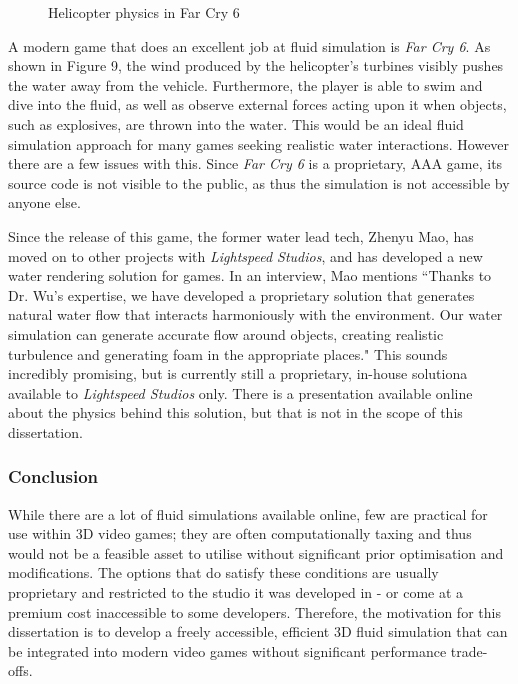 \documentclass[12pt]{article}
\newcommand{\wideimage}[2][]{%
  \makebox[\textwidth][c]{\texttt{[image: \#2]}}%
}
\begin{document}
    \begin{figure}[H]
        \wideimage[]{farCry6.png}
        \caption{Helicopter physics in Far Cry 6 \cite{farcry6video}}
    \end{figure}

    A modern game that does an excellent job at fluid simulation is \textit{Far Cry 6}. As shown in Figure 9, the wind produced by the helicopter's turbines visibly pushes the water away from the vehicle. Furthermore, the player is able to swim and dive into the fluid, as well as observe external forces acting upon it when objects, such as explosives, are thrown into the water. This would be an ideal fluid simulation approach for many games seeking realistic water interactions. However there are a few issues with this. Since \textit{Far Cry 6} is a proprietary, AAA game, its source code is not visible to the public, as thus the simulation is not accessible by anyone else.
    
    Since the release of this game, the former water lead tech, Zhenyu Mao, has moved on to other projects with \textit{Lightspeed Studios}, and has developed a new water rendering solution for games. In an interview\cite{zhenyu}, Mao mentions ``Thanks to Dr. Wu's expertise, we have developed a proprietary solution that generates natural water flow that interacts harmoniously with the environment. Our water simulation can generate accurate flow around objects, creating realistic turbulence and generating foam in the appropriate places." This sounds incredibly promising, but is currently still a proprietary, in-house solutiona available to \textit{Lightspeed Studios} only. There is a presentation available online about the physics behind this solution\cite{zhenyupresent}, but that is not in the scope of this dissertation.

    \subsubsection{Conclusion}

    While there are a lot of fluid simulations available online, few are practical for use within 3D video games; they are often computationally taxing and thus would not be a feasible asset to utilise without significant prior optimisation and modifications. The options that do satisfy these conditions are usually proprietary and restricted to the studio it was developed in - or come at a premium cost inaccessible to some developers. Therefore, the motivation for this dissertation is to develop a freely accessible, efficient 3D fluid simulation that can be integrated into modern video games without significant performance trade-offs.
\end{document}
